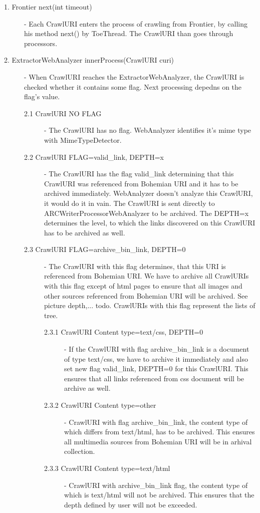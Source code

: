 \documentclass[11pt,a4paper]{article}
\begin{document}
\begin{description}
\item[1. Frontier next(int timeout)] - Each CrawlURI enters the process of crawling from Frontier, by calling his method next() by ToeThread. The CrawlURI than goes through processors.
\item[2. ExtractorWebAnalyzer innerProcess(CrawlURI curi)] - When CrawlURI reaches the ExtractorWebAnalyzer, the CrawlURI is checked whether it contains some flag. Next processing depedns on the flag's value.

\begin{description}
\item[2.1 CrawlURI NO FLAG] - The CrawlURI has no flag. WebAnalyzer identifies it's mime type with MimeTypeDetector.
\item[2.2 CrawlURI FLAG=valid\_link, DEPTH=x] - The CrawlURI has the flag valid\_link determining that this CrawlURI was referenced from Bohemian URI and it has to be archived immediately. WebAnalyzer doesn't analyze this CrawlURI, it would do it in vain. The CrawlURI is sent directly to ARCWriterProcessorWebAnalyzer to be archived. The DEPTH=x determines the level, to which the links discovered on this CrawlURI has to be archived as well.
\item[2.3 CrawlURI FLAG=archive\_bin\_link, DEPTH=0] - The CrawlURI with this flag determines, that this URI is referenced from Bohemian URI. We have to archive all CrawlURIs with this flag except of html pages to ensure that all images and other sources referenced from Bohemian URI will be archived. See picture depth,... todo. CrawlURIs with this flag represent the lists of tree.

\begin{description}
\item[2.3.1 CrawlURI Content type=text/css, DEPTH=0] - If the CrawlURI with flag archive\_bin\_link is a document of type text/css, we have to archive it immediately and also set new flag valid\_link, DEPTH=0 for this CrawlURI. This ensures that all links referenced from css document will be archive as well. 
\item[2.3.2 CrawlURI Content type=other] - CrawlURI with flag archive\_bin\_link, the content type of which differs from text/html, has to be archived. This ensures all multimedia sources from Bohemian URI will be in arhival collection.
\item[2.3.3 CrawlURI Content type=text/html] - CrawlURI with archive\_bin\_link flag, the content type of which is text/html will not be archived. This ensures that the depth defined by user will not be exceeded.
\end{description}
\end{description}



\end{description}
\end{document}
